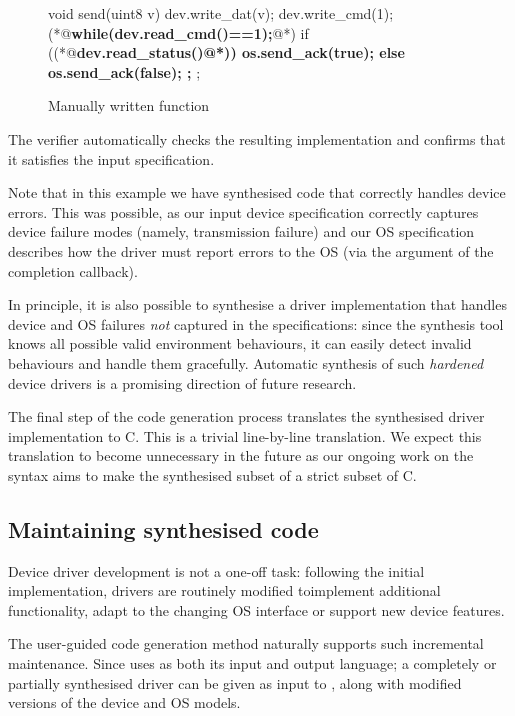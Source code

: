 \begin{figure}
\begin{tsllisting}
void send(uint8 v){
    dev.write_dat(v);
    dev.write_cmd(1);
    (*@{\bf\ttfamily while(dev.read\_cmd()==1){};}@*)
    if ((*@\bf\ttfamily dev.read\_status()@*)) {
        os.send_ack(true);
    } else {
        os.send_ack(false);
    };
};
\end{tsllisting}
\caption{Manually written  function}
\label{f:ex_man_send}
\end{figure}

The verifier automatically checks the resulting implementation and confirms that it satisfies the input specification.

Note that in this example we have synthesised code that correctly handles device errors.  This was possible, as our input device specification correctly captures device failure modes (namely, transmission failure) and our OS specification describes how the driver must report errors to the OS (via the  argument of the completion callback).

In principle, it is also possible to synthesise a driver implementation that handles device and OS failures \emph{not} captured in the specifications: since the synthesis tool knows all possible valid environment behaviours, it can easily detect invalid behaviours and handle them gracefully.  Automatic synthesis of such \emph{hardened} device drivers is a promising direction of future research.

The final step of the code generation process translates the synthesised driver implementation to C.  This is a trivial line-by-line translation.  We expect this translation to become unnecessary in the future as our ongoing work on the \tsl syntax aims to make the synthesised subset of \tsl a strict subset of C.

\subsection{Maintaining synthesised code~~} 
Device driver development is not a one-off task: following the initial implementation, drivers are routinely modified toimplement additional functionality, adapt to the changing OS interface or support new device features.

The user-guided code generation method naturally supports such incremental maintenance. Since \termite uses \tsl as both its input and output language;  a completely or partially synthesised driver can be given as input to \termite, along with modified versions of the device and OS models.

